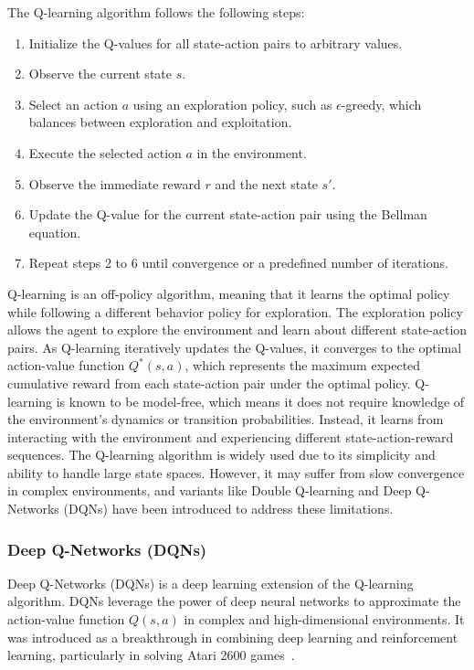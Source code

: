 The Q-learning algorithm follows the following steps:
\begin{enumerate}
    \item Initialize the Q-values for all state-action pairs to arbitrary values.
    \item Observe the current state \(s\).
    \item Select an action \(a\) using an exploration policy, such as \(\epsilon\)-greedy, which balances between exploration and exploitation.
    \item Execute the selected action \(a\) in the environment.
    \item Observe the immediate reward \(r\) and the next state \(s'\).
    \item Update the Q-value for the current state-action pair using the Bellman equation.
    \item Repeat steps 2 to 6 until convergence or a predefined number of iterations.
\end{enumerate}
Q-learning is an off-policy algorithm, meaning that it learns the optimal policy while following a different behavior policy for exploration. The exploration policy allows the agent to explore the environment and learn about different state-action pairs.
As Q-learning iteratively updates the Q-values, it converges to the optimal action-value function \(Q^*(s, a)\), which represents the maximum expected cumulative reward from each state-action pair under the optimal policy.
Q-learning is known to be model-free, which means it does not require knowledge of the environment's dynamics or transition probabilities. Instead, it learns from interacting with the environment and experiencing different state-action-reward sequences.
The Q-learning algorithm is widely used due to its simplicity and ability to handle large state spaces. However, it may suffer from slow convergence in complex environments, and variants like Double Q-learning and Deep Q-Networks (DQNs) have been introduced to address these limitations.

\subsubsection{Deep Q-Networks (DQNs)}
Deep Q-Networks (DQNs) is a deep learning extension of the Q-learning algorithm. DQNs leverage the power of deep neural networks to approximate the action-value function \(Q(s, a)\) in complex and high-dimensional environments. It was introduced as a breakthrough in combining deep learning and reinforcement learning, particularly in solving Atari 2600 games~\cite{Mnih2013}.

